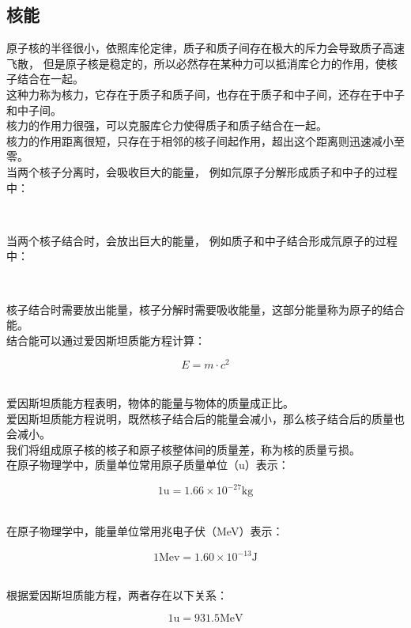 \documentclass[UTF8]{ctexart}
\begin{document}
\subsection{核能}
    原子核的半径很小，依照库伦定律，质子和质子间存在极大的斥力会导致质子高速飞散，
    但是原子核是稳定的，所以必然存在某种力可以抵消库仑力的作用，使核子结合在一起。\\[3mm]
    这种力称为核力，它存在于质子和质子间，也存在于质子和中子间，还存在于中子和中子间。\\[3mm]
    核力的作用力很强，可以克服库仑力使得质子和质子结合在一起。\\[3mm]
    核力的作用距离很短，只存在于相邻的核子间起作用，超出这个距离则迅速减小至零。\\[5mm]
    当两个核子分离时，会吸收巨大的能量，
    例如氘原子分解形成质子和中子的过程中：
    \begin{center}
        \\[7mm]
    \end{center}
    当两个核子结合时，会放出巨大的能量，
    例如质子和中子结合形成氘原子的过程中：
    \begin{center}
        \\[7mm]
    \end{center}
    核子结合时需要放出能量，核子分解时需要吸收能量，这部分能量称为原子的结合能。\\[3mm]
    结合能可以通过爱因斯坦质能方程计算：
    \begin{large}
        \begin{equation*}
            E=m\cdot c^2
        \end{equation*}
    \end{large}\\
    爱因斯坦质能方程表明，物体的能量与物体的质量成正比。\\[3mm]
    爱因斯坦质能方程说明，既然核子结合后的能量会减小，那么核子结合后的质量也会减小。\\[3mm]
    我们将组成原子核的核子和原子核整体间的质量差，称为核的质量亏损。\\[6mm]
    在原子物理学中，质量单位常用原子质量单位（u）表示：
    \begin{large}
        \begin{equation*}
            1\text{u}=1.66\times 10^{-27}\text{kg}
        \end{equation*}
    \end{large}\\
    在原子物理学中，能量单位常用兆电子伏（MeV）表示：
    \begin{large}
        \begin{equation*}
            1\text{Mev}=1.60\times 10^{-13}\text{J}
        \end{equation*}
    \end{large}\\
    根据爱因斯坦质能方程，两者存在以下关系：
    \begin{large}
        \begin{equation*}
            1\text{u}=931.5\text{MeV}
        \end{equation*}
    \end{large}
\end{document}
